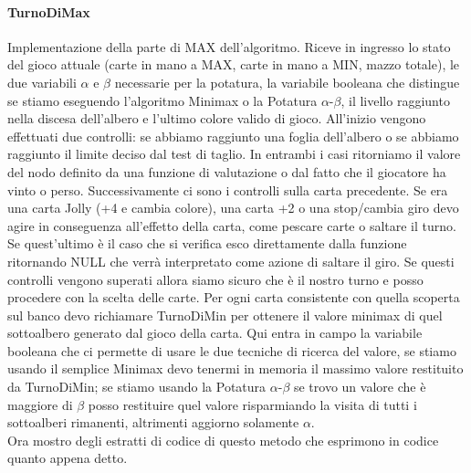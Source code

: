 		\paragraph{TurnoDiMax}
		Implementazione della parte di MAX dell'algoritmo. Riceve in ingresso lo stato del gioco attuale (carte in mano a MAX, carte in mano a MIN, mazzo totale), le due variabili $\alpha$ e $\beta$ necessarie per la potatura, la variabile booleana che distingue se stiamo eseguendo l'algoritmo Minimax o la Potatura $\alpha$-$\beta$, il livello raggiunto nella discesa dell'albero e l'ultimo colore valido di gioco. All'inizio vengono effettuati due controlli: se abbiamo raggiunto una foglia dell'albero o se abbiamo raggiunto il limite deciso dal test di taglio. In entrambi i casi ritorniamo il valore del nodo definito da una funzione di valutazione o dal fatto che il giocatore ha vinto o perso. Successivamente ci sono i controlli sulla carta precedente. Se era una carta Jolly (+4 e cambia colore), una carta +2 o una stop/cambia giro devo agire in conseguenza all'effetto della carta, come pescare carte o saltare il turno. Se quest'ultimo è il caso che si verifica esco direttamente dalla funzione ritornando NULL che verrà interpretato come azione di saltare il giro. Se questi controlli vengono superati allora siamo sicuro che è il nostro turno e posso procedere con la scelta delle carte. Per ogni carta consistente con quella scoperta sul banco devo richiamare TurnoDiMin per ottenere il valore minimax di quel sottoalbero generato dal gioco della carta. Qui entra in campo la variabile booleana che ci permette di usare le due tecniche di ricerca del valore, se stiamo usando il semplice Minimax devo tenermi in memoria il massimo valore restituito da TurnoDiMin; se stiamo usando la Potatura $\alpha$-$\beta$ se trovo un valore che è maggiore di $\beta$ posso restituire quel valore risparmiando la visita di tutti i sottoalberi rimanenti, altrimenti aggiorno solamente $\alpha$.\\
		Ora mostro degli estratti di codice di questo metodo che esprimono in codice quanto appena detto. \\
	
